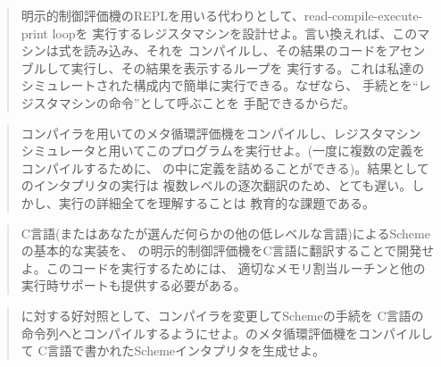 \begin{quote}
明示的制御評価機のREPLを用いる代わりとして、read-compile-execute-print loopを
実行するレジスタマシンを設計せよ。言い換えれば、このマシンは式を読み込み、それを
コンパイルし、その結果のコードをアセンブルして実行し、その結果を表示するループを
実行する。これは私達のシミュレートされた構成内で簡単に実行できる。なぜなら、
手続とを``レジスタマシンの命令''として呼ぶことを
手配できるからだ。
\end{quote}

\begin{quote}
コンパイラを用いてのメタ循環評価機をコンパイルし、レジスタマシン
シミュレータと用いてこのプログラムを実行せよ。(一度に複数の定義をコンパイルするために、
の中に定義を詰めることができる)。結果としてのインタプリタの実行は
複数レベルの逐次翻訳のため、とても遅い。しかし、実行の詳細全てを理解することは
教育的な課題である。
\end{quote}

\begin{quote}
C言語(またはあなたが選んだ何らかの他の低レベルな言語)によるSchemeの基本的な実装を、
の明示的制御評価機をC言語に翻訳することで開発せよ。このコードを実行するためには、
適切なメモリ割当ルーチンと他の実行時サポートも提供する必要がある。
\end{quote}

\begin{quote}
に対する好対照として、コンパイラを変更してSchemeの手続を
C言語の命令列へとコンパイルするようにせよ。のメタ循環評価機をコンパイルして
C言語で書かれたSchemeインタプリタを生成せよ。
\end{quote}
